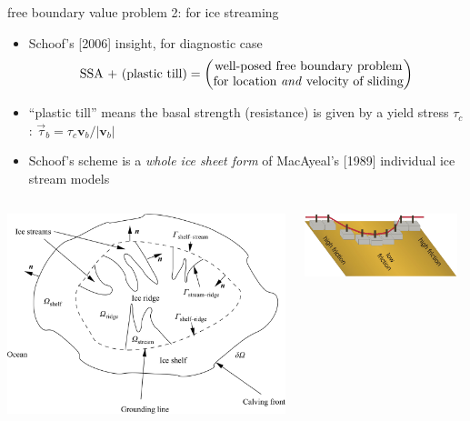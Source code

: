 \begin{frame}{free boundary value problem 2: for ice streaming}

\begin{itemize}
\item  Schoof's [2006] insight, for diagnostic case
  $$\text{SSA + (plastic till)} = \begin{pmatrix}
\text{well-posed free boundary problem} \\ \text{for location \emph{and} velocity of sliding}
\end{pmatrix} $$
\item ``plastic till'' means the basal strength (resistance) is given by a yield stress $\tau_c$:  \qquad $\vec\tau_b = \tau_c \mathbf{v}_b / |\mathbf{v}_b|$
\item Schoof's scheme is a \emph{whole ice sheet form} of MacAyeal's [1989] individual ice stream models
\end{itemize}

\begin{columns}
\begin{column}{0.5\textwidth}
\begin{center}
  \includegraphics[width=1.0\textwidth]{photos/schoof_planform}
\end{center}
\end{column}
\begin{column}{0.5\textwidth}
\begin{center}
  \includegraphics[width=0.95\textwidth]{photos/schoof_sliders}
\end{center}
\end{column}
\end{columns}
\end{frame}


